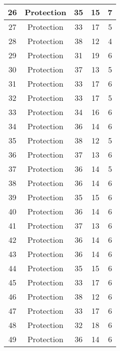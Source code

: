 \documentclass[results.tex]{subfiles}
\begin{document}
\begin{center}
\begin{tabular}{| c || c | c | c | c |}
    \hline
    26 & Protection & 35 & 15 & 7 \\ 
    \hline
    27 & Protection & 33 & 17 & 5 \\ 
    \hline
    28 & Protection & 38 & 12 & 4 \\ 
    \hline
    29 & Protection & 31 & 19 & 6 \\ 
    \hline
    30 & Protection & 37 & 13 & 5 \\ 
    \hline
    31 & Protection & 33 & 17 & 6 \\ 
    \hline
    32 & Protection & 33 & 17 & 5 \\ 
    \hline
    33 & Protection & 34 & 16 & 6 \\ 
    \hline
    34 & Protection & 36 & 14 & 6 \\ 
    \hline
    35 & Protection & 38 & 12 & 5 \\ 
    \hline
    36 & Protection & 37 & 13 & 6 \\ 
    \hline
    37 & Protection & 36 & 14 & 5 \\ 
    \hline
    38 & Protection & 36 & 14 & 6 \\ 
    \hline
    39 & Protection & 35 & 15 & 6 \\ 
    \hline
    40 & Protection & 36 & 14 & 6 \\ 
    \hline
    41 & Protection & 37 & 13 & 6 \\ 
    \hline
    42 & Protection & 36 & 14 & 6 \\ 
    \hline
    43 & Protection & 36 & 14 & 6 \\ 
    \hline
    44 & Protection & 35 & 15 & 6 \\ 
    \hline
    45 & Protection & 33 & 17 & 6 \\ 
    \hline
    46 & Protection & 38 & 12 & 6 \\ 
    \hline
    47 & Protection & 33 & 17 & 6 \\ 
    \hline
    48 & Protection & 32 & 18 & 6 \\ 
    \hline
    49 & Protection & 36 & 14 & 6 \\ 
    \hline   \end{tabular}
\end{center}
\end{document}
